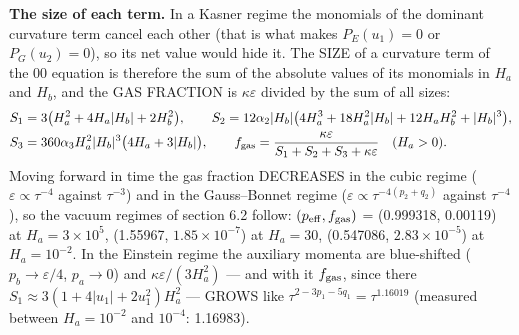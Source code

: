 \documentclass[10pt,a4paper]{article}
\begin{document}
\textbf{The size of each term.} In a Kasner regime the monomials of the dominant curvature term cancel each other (that is what makes $P_E(u_1)=0$ or $P_G(u_2)=0$), so its net value would hide it. The SIZE of a curvature term of the 00 equation is therefore the sum of the absolute values of its monomials in $H_a$ and $H_b$, and the GAS FRACTION is $\kappa\varepsilon$ divided by the sum of all sizes:
\begin{align*}
S_1&=3\big(H_a^2+4H_a|H_b|+2H_b^2\big),\qquad S_2=12\alpha_2|H_b|\big(4H_a^3+18H_a^2|H_b|+12H_aH_b^2+|H_b|^3\big), \\
S_3&=360\alpha_3H_a^2|H_b|^3\big(4H_a+3|H_b|\big),\qquad f_{\rm gas}=\frac{\kappa\varepsilon}{S_1+S_2+S_3+\kappa\varepsilon}\quad(H_a>0).
\end{align*}
Moving forward in time the gas fraction DECREASES in the cubic regime ($\varepsilon\propto\tau^{-4}$ against $\tau^{-3}$) and in the Gauss–Bonnet regime ($\varepsilon\propto\tau^{-4(p_2+q_2)}$ against $\tau^{-4}$), so the vacuum regimes of section 6.2 follow: $(p_{\rm eff},f_{\rm gas})$ = (0.999318, 0.00119) at $H_a=3\times10^5$, (1.55967, $1.85\times10^{-7}$) at $H_a=30$, (0.547086, $2.83\times10^{-5}$) at $H_a=10^{-2}$. In the Einstein regime the auxiliary momenta are blue-shifted ($p_b\to\varepsilon/4$, $p_a\to0$) and $\kappa\varepsilon/(3H_a^2)$ — and with it $f_{\rm gas}$, since there $S_1\approx3(1+4|u_1|+2u_1^2)H_a^2$ — GROWS like $\tau^{2-3p_1-5q_1}=\tau^{1.16019}$ (measured between $H_a=10^{-2}$ and $10^{-4}$: 1.16983).
\end{document}
